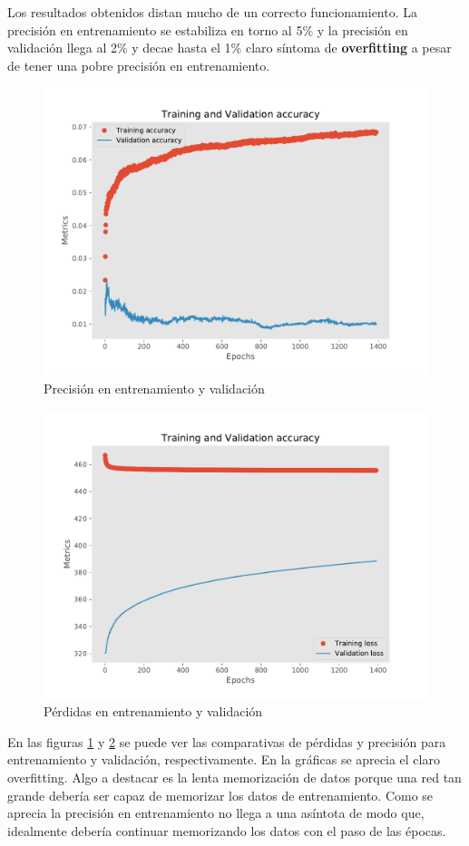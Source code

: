 Los resultados obtenidos distan mucho de un correcto funcionamiento. La precisión en entrenamiento se estabiliza en torno al 5\% y la precisión en validación llega al 2\% y decae hasta el 1\% claro síntoma de \textbf{overfitting} a pesar de tener una pobre precisión en entrenamiento.

\begin{figure}[h!]
	\centering
	\includegraphics[width=0.75\columnwidth]{figures/one_to_one_results_acc.pdf}
	\caption{Precisión en entrenamiento y validación}
	\label{fig: results_acc}
\end{figure}
\begin{figure}[t!]
	\centering
	\includegraphics[width=0.75\columnwidth]{figures/one_to_one_results_loss.pdf}
	\caption{Pérdidas en entrenamiento y validación}
	\label{fig: results_loss}
\end{figure}

En las figuras \ref{fig: results_acc} y \ref{fig: results_loss} se puede ver las comparativas de pérdidas y precisión para entrenamiento y validación, respectivamente. En la gráficas se aprecia el claro overfitting. Algo a destacar es la lenta memorización de datos porque una red tan grande debería ser capaz de memorizar los datos de entrenamiento. Como se aprecia la precisión en entrenamiento no llega a una asíntota de modo que, idealmente debería continuar memorizando los datos con el paso de las épocas.